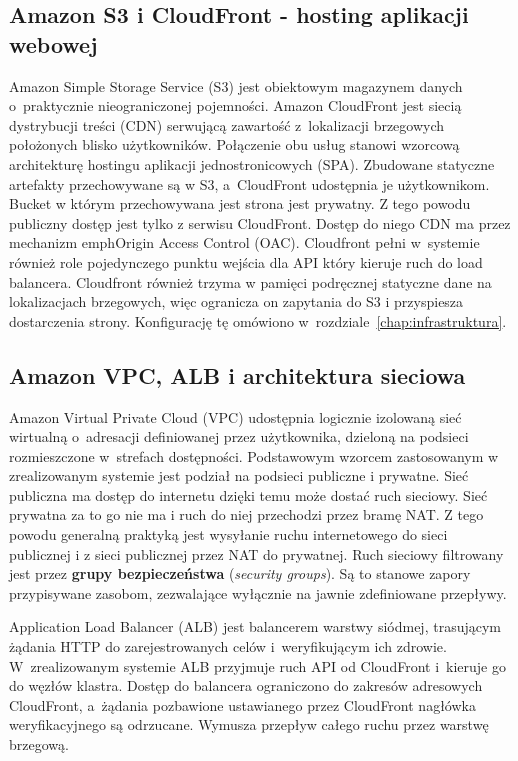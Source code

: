 \subsection{Amazon S3 i CloudFront - hosting aplikacji webowej}
\label{subsec:s3-cloudfront}

Amazon Simple Storage Service (S3) jest obiektowym magazynem danych o~praktycznie nieograniczonej pojemności.
Amazon CloudFront jest siecią dystrybucji treści (CDN) serwującą zawartość z~lokalizacji brzegowych położonych
blisko użytkowników. Połączenie obu usług stanowi wzorcową architekturę hostingu aplikacji jednostronicowych
(SPA). Zbudowane statyczne artefakty przechowywane są w S3, a~CloudFront udostępnia je użytkownikom.
Bucket w którym przechowywana jest strona jest prywatny. Z tego powodu publiczny dostęp jest tylko z serwisu
CloudFront. Dostęp do niego CDN ma przez mechanizm emph{Origin Access Control} (OAC). Cloudfront
pełni w~systemie również role pojedynczego punktu wejścia dla API który kieruje ruch do load balancera.
Cloudfront również trzyma w pamięci podręcznej statyczne dane na lokalizacjach brzegowych, więc ogranicza on zapytania do S3
i przyspiesza dostarczenia strony. Konfigurację tę omówiono w~rozdziale~\ref{chap:infrastruktura}.

\subsection{Amazon VPC, ALB i architektura sieciowa}
\label{subsec:vpc-alb}

Amazon Virtual Private Cloud (VPC) udostępnia logicznie izolowaną sieć wirtualną o~adresacji definiowanej przez
użytkownika, dzieloną na podsieci rozmieszczone w~strefach dostępności. Podstawowym wzorcem zastosowanym
w zrealizowanym systemie jest podział na podsieci publiczne i prywatne. Sieć publiczna ma dostęp do internetu
dzięki temu może dostać ruch sieciowy. Sieć prywatna za to go nie ma i ruch do niej przechodzi przez bramę NAT.
Z tego powodu generalną praktyką jest wysyłanie ruchu internetowego do sieci publicznej i z sieci publicznej przez
NAT do prywatnej. Ruch sieciowy filtrowany jest przez \textbf{grupy bezpieczeństwa} (\emph{security groups}).
Są to stanowe zapory przypisywane zasobom, zezwalające wyłącznie na jawnie zdefiniowane przepływy.

Application Load Balancer (ALB) jest balancerem warstwy siódmej, trasującym żądania HTTP do zarejestrowanych celów
i~weryfikującym ich zdrowie. W~zrealizowanym systemie ALB przyjmuje ruch API od CloudFront i~kieruje go do węzłów
klastra. Dostęp do balancera ograniczono do zakresów adresowych CloudFront, a~żądania pozbawione ustawianego przez
CloudFront nagłówka weryfikacyjnego są odrzucane. Wymusza przepływ całego ruchu przez warstwę brzegową.

